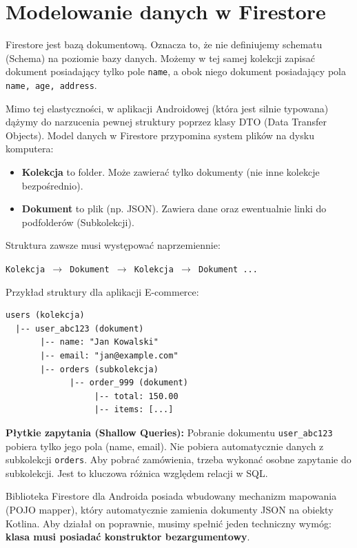 \section{Modelowanie danych w Firestore}

Firestore jest bazą dokumentową. Oznacza to, że nie definiujemy schematu (Schema) na poziomie bazy danych. Możemy w tej samej kolekcji zapisać dokument posiadający tylko pole \texttt{name}, a obok niego dokument posiadający pola \texttt{name, age, address}.

Mimo tej elastyczności, w aplikacji Androidowej (która jest silnie typowana) dążymy do narzucenia pewnej struktury poprzez klasy DTO (Data Transfer Objects). Model danych w Firestore przypomina system plików na dysku komputera:
\begin{itemize}
    \item \textbf{Kolekcja} to folder. Może zawierać tylko dokumenty (nie inne kolekcje bezpośrednio).
    \item \textbf{Dokument} to plik (np. JSON). Zawiera dane oraz ewentualnie linki do podfolderów (Subkolekcji).
\end{itemize}

Struktura zawsze musi występować naprzemiennie:
\begin{center}
\texttt{Kolekcja $\rightarrow$ Dokument $\rightarrow$ Kolekcja $\rightarrow$ Dokument ...}
\end{center}

Przykład struktury dla aplikacji E-commerce:
\begin{verbatim}
users (kolekcja)
  |-- user_abc123 (dokument)
       |-- name: "Jan Kowalski"
       |-- email: "jan@example.com"
       |-- orders (subkolekcja)
             |-- order_999 (dokument)
                  |-- total: 150.00
                  |-- items: [...]
\end{verbatim}

\textbf{Płytkie zapytania (Shallow Queries):} Pobranie dokumentu \texttt{user\_abc123} pobiera tylko jego pola (name, email). Nie pobiera automatycznie danych z subkolekcji \texttt{orders}. Aby pobrać zamówienia, trzeba wykonać osobne zapytanie do subkolekcji. Jest to kluczowa różnica względem relacji w SQL.

Biblioteka Firestore dla Androida posiada wbudowany mechanizm mapowania (POJO mapper), który automatycznie zamienia dokumenty JSON na obiekty Kotlina. Aby działał on poprawnie, musimy spełnić jeden techniczny wymóg: \textbf{klasa musi posiadać konstruktor bezargumentowy}.

